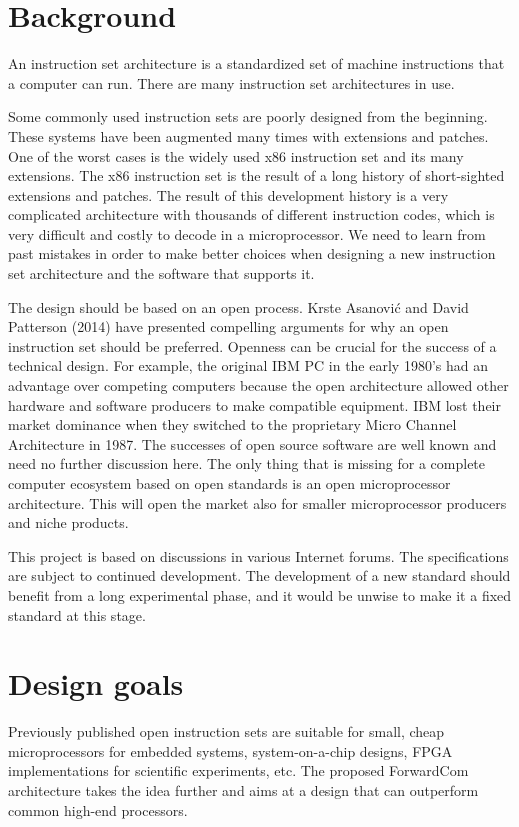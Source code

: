 \documentclass[forwardcom.tex]{subfiles}
\begin{document}
\section{Background}
An instruction set architecture is a standardized set of machine instructions that a computer can run. There are many instruction set architectures in use.
\vv

Some commonly used instruction sets are poorly designed from the beginning. These systems have been augmented many times with extensions and patches. One of the worst cases is the widely used x86 instruction set and its many extensions. The x86 instruction set is the result of a long history of short-sighted extensions and patches. The result of this development history is a very complicated architecture with thousands of different instruction codes, which is very difficult and costly to decode in a microprocessor. We need to learn from past mistakes in order to make better choices when designing a new instruction set architecture and the software that supports it.
\vv

The design should be based on an open process. Krste Asanović and David Patterson (2014) have presented compelling arguments for why an open instruction set should be preferred. Openness can be crucial for the success of a technical design. For example, the original IBM PC in the early 1980's had an advantage over competing computers because the open architecture allowed other hardware and software producers to make compatible equipment. IBM lost their market dominance when they switched to the proprietary Micro Channel Architecture in 1987. The successes of open source software are well known and need no further discussion here. The only thing that is missing for a complete computer ecosystem based on open standards is an open microprocessor architecture. This will open the market also for smaller microprocessor producers and niche products.
\vv

This project is based on discussions in various Internet forums. The specifications are subject to continued development. The development of a new standard should benefit from a long experimental phase, and it would be unwise to make it a fixed standard at this stage.


\section{Design goals}
Previously published open instruction sets are suitable for small, cheap microprocessors for embedded systems, system-on-a-chip designs, FPGA implementations for scientific experiments, etc. The proposed ForwardCom architecture takes the idea further and aims at a design that can outperform common high-end processors.
\vv
\end{document}
